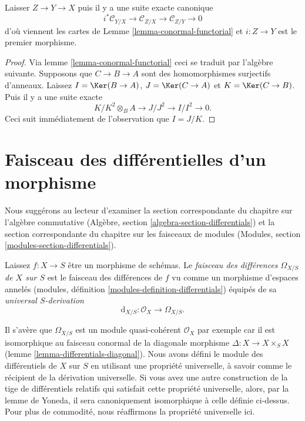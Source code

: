 \begin{lemma}

\label{lemma-transitivity-conormal}

Laisser $Z \to Y \to X$ puis il y a une suite exacte canonique
$$
i^*\mathcal{C}_{Y/X} \to
\mathcal{C}_{Z/X} \to
\mathcal{C}_{Z/Y} \to 0
$$
d'où viennent les cartes de Lemme \ref{lemma-conormal-functorial}
et $i : Z \to Y$ est le premier morphisme.

\end{lemma}

\begin{proof}
Via lemme \ref{lemma-conormal-functorial} ceci se traduit par l'algèbre suivante. Supposons que $C \to B \to A$ sont des homomorphismes surjectifs d'anneaux. Laissez $I = \Ker(B \to A)$, $J = \Ker(C \to A)$ et $K = \Ker(C \to B)$. Puis il y a une suite exacte $$
K/K^2 \otimes_B A \to J/J^2 \to I/I^2 \to 0.
$$ Ceci suit immédiatement de l'observation que $I = J/K$.
\end{proof}










\section{Faisceau des différentielles d'un morphisme}
\label{section-sheaf-differentials}

\noindent
Nous suggérons au lecteur d'examiner la section correspondante du chapitre sur l'algèbre commutative (Algèbre, section \ref{algebra-section-differentials}) et la section correspondante du chapitre sur les faisceaux de modules (Modules, section \ref{modules-section-differentials}).

\begin{definition}

\label{definition-sheaf-differentials}
Laissez $f : X \to S$ être un morphisme de schémas. Le {\it faisceau des différences $\Omega_{X/S}$ de $X$ sur $S$} est le faisceau des différences de $f$ vu comme un morphisme d'espaces annelés (modules, définition \ref{modules-definition-differentials}) équipés de sa {\it universal $S$-derivation} $$
\text{d}_{X/S} : \mathcal{O}_X \longrightarrow \Omega_{X/S}.
$$
\end{definition}

\noindent
Il s'avère que $\Omega_{X/S}$ est un module quasi-cohérent $\mathcal{O}_X$ par exemple car il est isomorphique au faisceau conormal de la diagonale morphisme $\Delta : X \to X \times_S X$ (lemme \ref{lemma-differentials-diagonal}). Nous avons défini le module des différentiels de $X$ sur $S$ en utilisant une propriété universelle, à savoir comme le récipient de la dérivation universelle. Si vous avez une autre construction de la tige de différentiels relatifs qui satisfait cette propriété universelle, alors, par la lemme de Yoneda, il sera canoniquement isomorphique à celle définie ci-dessus. Pour plus de commodité, nous réaffirmons la propriété universelle ici.

